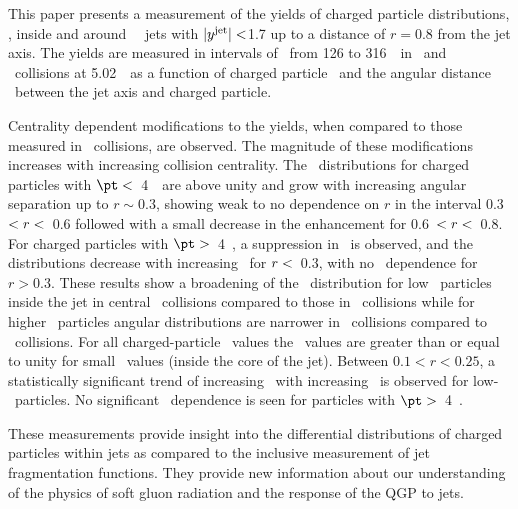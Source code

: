 
This paper presents a measurement of the yields of charged particle distributions, \Dptr, inside and around \RFour\ \antikt\ jets with $|\mbox{$y^{\mathrm{jet}}$}| <$1.7 up to a distance of $r = 0.8$ from the jet axis. The yields are measured in intervals of \ptjet\ from 126 to 316~\GeV\ in \PbPb\ and \pp\ collisions at 5.02~\TeV\ as a function of charged particle \pt\ and the angular distance \rvar\ between the jet axis and charged particle.

Centrality dependent modifications to the yields, when compared to those measured in \pp\ collisions, are observed. The magnitude of these modifications increases with increasing collision centrality. 
The \RDptr\ distributions for charged particles with $\pt <$~4~\GeV\ 
are above unity and 
grow with increasing angular separation up to $r \sim0.3$, showing weak to no dependence on $r$ in the interval 0.3~$< \mbox{$r$} <$~0.6 followed with a small decrease in the enhancement for 0.6~$< \mbox{$r$} <$~0.8.
For charged particles with $\pt >$~4~\GeV, a suppression in \RDptr\ is observed, and the 
distributions decrease with increasing
\rvar\ for $\mbox{$r$} < $~0.3, with no \rvar\ dependence for $r>0.3$. 
These results show a broadening of the \Dptr\ distribution for low \pt\ particles inside the jet
in central \pbpb\ collisions compared to those in \pp\ collisions while for higher \pt\ particles
angular distributions are narrower in \pbpb\ collisions compared to \pp\ collisions.
For all charged-particle \pt\ values the \RDptr\ values are greater than or equal to unity for
small \rvar\ values (inside the core of the jet).
Between $0.1 < r < 0.25$, a statistically significant trend of increasing \RDptr\ with increasing \ptjet\ is observed for low-\pt\ particles. No significant \ptjet\ dependence is seen for particles  with $\pt >$~4~\GeV.

These measurements provide insight into the differential distributions of charged particles within jets as compared to the inclusive measurement of jet fragmentation functions. %
They provide new information about our understanding of the physics of soft
gluon radiation and the response of the QGP to jets.
